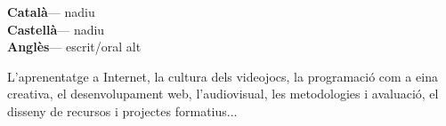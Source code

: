 \documentclass[9pt]{developercv} %
\begin{document}
\begin{minipage}[t]{0.25\textwidth}
  \vspace{-\baselineskip} %

  
  \textbf{Català}\hspace{1.75em}--- nadiu\\
  \textbf{Castellà}\hspace{1em}--- nadiu\\
  \textbf{Anglès}\hspace{1.6em}--- escrit/oral alt
\end{minipage}
\hfill
\begin{minipage}[t]{0.7\textwidth}
  \vspace{-\baselineskip} %
  

  L'aprenentatge a Internet, la cultura dels videojocs, la programació com a eina creativa, el desenvolupament web, l'audiovisual, les metodologies i avaluació, el disseny de recursos i projectes formatius...
\end{minipage}
  
  

\end{document}
